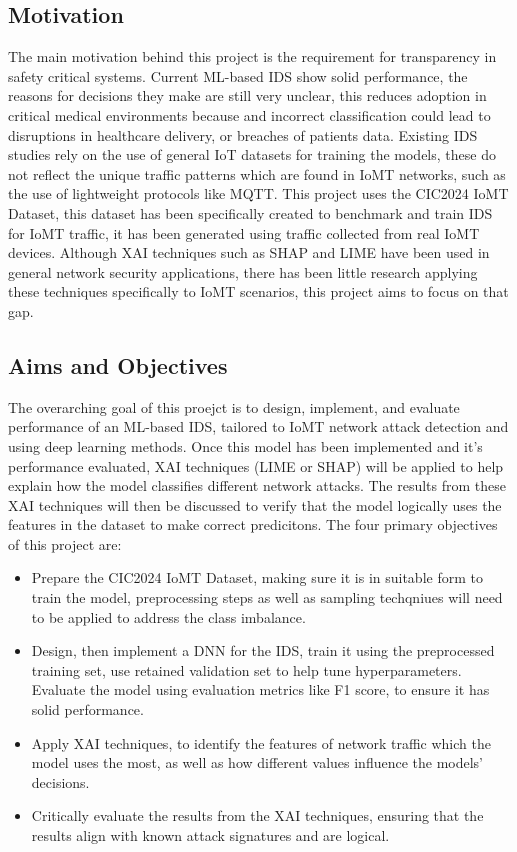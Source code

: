 \documentclass[11pt,a4paper]{article}
\begin{document}
\subsection{Motivation}
The main motivation behind this project is the requirement for transparency in safety critical systems. Current ML-based
IDS show solid performance, the reasons for decisions they make are still very unclear, this reduces adoption in critical medical
environments because and incorrect classification could lead to disruptions in healthcare delivery, or breaches of patients data.
Existing IDS studies rely on the use of general IoT datasets for training the models, these do not reflect the unique traffic patterns
which are found in IoMT networks, such as the use of lightweight protocols like MQTT. This project uses the CIC2024 IoMT Dataset, this dataset
has been specifically created to benchmark and train IDS for IoMT traffic, it has been generated using traffic collected from real IoMT devices.
Although XAI techniques such as SHAP and LIME have been used in general network security applications, there has been little research applying these
techniques specifically to IoMT scenarios, this project aims to focus on that gap.

\subsection{Aims and Objectives}
The overarching goal of this proejct is to design, implement, and evaluate performance of an ML-based IDS, tailored to
IoMT network attack detection and using deep learning methods. Once this model has been implemented and it's performance
evaluated, XAI techniques (LIME or SHAP) will be applied to help explain how the model classifies different network attacks.
The results from these XAI techniques will then be discussed to verify that the model logically uses the features in the dataset
to make correct predicitons.
\newline
The four primary objectives of this project are:
\begin{itemize}
    \item Prepare the CIC2024 IoMT Dataset, making sure it is in suitable form to train the model, preprocessing steps as well as sampling techqniues will need to be applied to address the class imbalance.
    \item Design, then implement a DNN for the IDS, train it using the preprocessed training set, use retained validation set to help tune hyperparameters. Evaluate the model using evaluation metrics like F1 score, to ensure it has solid performance.
    \item Apply XAI techniques, to identify the features of network traffic which the model uses the most, as well as how different values influence the models' decisions.
    \item Critically evaluate the results from the XAI techniques, ensuring that the results align with known attack signatures and are logical.
\end{itemize}
\end{document}
